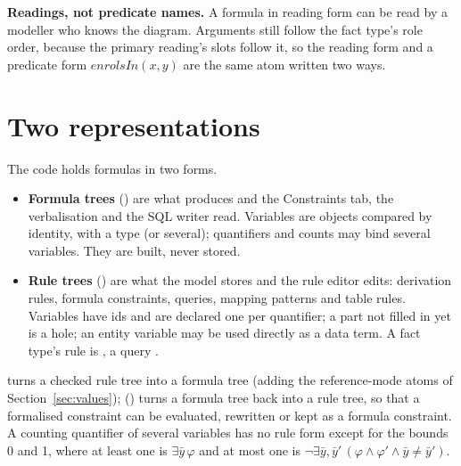\documentclass[11pt, a4paper]{article}
\begin{document}
\begin{rationale}
\textbf{Readings, not predicate names.} A formula in reading form can be
read by a modeller who knows the diagram. Arguments still follow the fact
type's role order, because the primary reading's slots follow it, so the
reading form and a predicate form $\mathit{enrolsIn}(x,y)$ are the same atom
written two ways.
\end{rationale}

\section{Two representations}
\label{sec:representations}

The code holds formulas in two forms.

\begin{itemize}
  \item \textbf{Formula trees} () are what
         produces and the Constraints tab, the verbalisation
        and the SQL writer read. Variables are objects compared by identity,
        with a type (or several); quantifiers and counts may bind several
        variables. They are built, never stored.
  \item \textbf{Rule trees} () are what the
        model stores and the rule editor edits: derivation rules, formula
        constraints, queries, mapping patterns and table rules. Variables have
        ids and are declared one per quantifier; a part not filled in yet is a
        hole; an entity variable may be used directly as a data term. A
        fact type's rule is , a query
        .
\end{itemize}

 turns a checked rule tree into a formula tree (adding the
reference-mode atoms of Section~\ref{sec:values}); 
() turns a formula tree back into a rule
tree, so that a formalised constraint can be evaluated, rewritten or kept as
a formula constraint. A counting quantifier of several variables has no rule
form except for the bounds 0 and 1, where at least one is $\exists\bar y\,\varphi$
and at most one is $\neg\exists\bar y,\bar y'\,(\varphi\wedge\varphi'\wedge
\bar y\ne\bar y')$.

\end{document}
